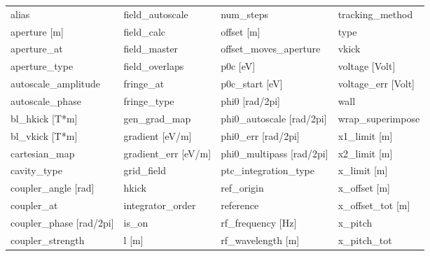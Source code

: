  \begin{tabular}{llll} \toprule
alias                            & field_autoscale                  & num_steps                        & tracking_method                  \\
aperture [m]                     & field_calc                       & offset [m]                       & type                             \\
aperture_at                      & field_master                     & offset_moves_aperture            & vkick                            \\
aperture_type                    & field_overlaps                   & p0c [eV]                         & voltage [Volt]                   \\
autoscale_amplitude              & fringe_at                        & p0c_start [eV]                   & voltage_err [Volt]               \\
autoscale_phase                  & fringe_type                      & phi0 [rad/2pi]                   & wall                             \\
bl_hkick [T*m]                   & gen_grad_map                     & phi0_autoscale [rad/2pi]         & wrap_superimpose                 \\
bl_vkick [T*m]                   & gradient [eV/m]                  & phi0_err [rad/2pi]               & x1_limit [m]                     \\
cartesian_map                    & gradient_err [eV/m]              & phi0_multipass [rad/2pi]         & x2_limit [m]                     \\
cavity_type                      & grid_field                       & ptc_integration_type             & x_limit [m]                      \\
coupler_angle [rad]              & hkick                            & ref_origin                       & x_offset [m]                     \\
coupler_at                       & integrator_order                 & reference                        & x_offset_tot [m]                 \\
coupler_phase [rad/2pi]          & is_on                            & rf_frequency [Hz]                & x_pitch                          \\
coupler_strength                 & l [m]                            & rf_wavelength [m]                & x_pitch_tot                      \\

\end{tabular}

